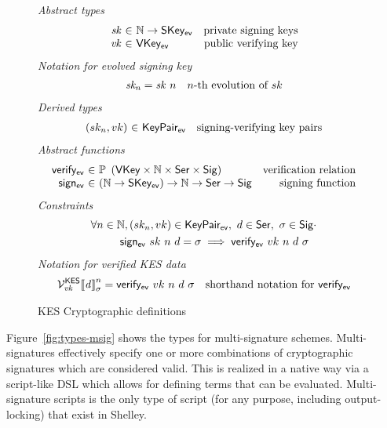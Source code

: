 \begin{figure}[htb]
  \emph{Abstract types}
  \begin{equation*}
    \begin{array}{r@{~\in~}lr}
      \var{sk} & \N \to \SKeyEv & \text{private signing keys}\\
      \var{vk} & \VKeyEv & \text{public verifying key}\\
    \end{array}
  \end{equation*}
  \emph{Notation for evolved signing key}
  \begin{align*}
    & \mathit{sk_n} = \mathit{sk}~n & n\text{-th evolution of }sk
  \end{align*}
  \emph{Derived types}
  \begin{equation*}
    \begin{array}{r@{~\in~}lr}
      (sk_n, vk) & \KeyPairEv & \text{signing-verifying key pairs}
    \end{array}
  \end{equation*}
  \emph{Abstract functions}
  \begin{equation*}
    \begin{array}{r@{~\in~}lr}
      \fun{verify_{ev}} & \powerset{\left(\VKey \times \N \times \Ser \times \Sig\right)}
                        & \text{verification relation}\\
      \fun{sign_{ev}} & (\N \to \SKeyEv) \to \N \to \Ser \to \Sig
                      & \text{signing function}\\
    \end{array}
  \end{equation*}
  \emph{Constraints}
  \begin{align*}
    & \forall n\in\mathbb{N}, (sk_n, vk) \in \mathsf{KeyPair_{ev}}, ~ d \in \mathsf{Ser},~ \sigma \in \mathsf{Sig} \cdot \\
    & ~~~~~~~~\mathsf{sign_{ev}}~{sk}~{n}~{d} = \sigma \implies \mathsf{verify_{ev}} ~ vk ~ n ~ d ~ \sigma
  \end{align*}
  \emph{Notation for verified KES data}
  \begin{align*}
    & \mathcal{V}^{\mathsf{KES}}_{\mathit{vk}}{\llbracket \mathit{d} \rrbracket}_{\sigma}^n
        = \mathsf{verify_{ev}} ~ vk ~ n ~ d ~ \sigma
    & \text{shorthand notation for } \mathsf{verify_{ev}}
  \end{align*}
  \caption{KES Cryptographic definitions}
  \label{fig:kes-defs-shelley}
\end{figure}

Figure~\ref{fig:types-msig} shows the types for multi-signature
schemes. Multi-signatures effectively specify one or more combinations of
cryptographic signatures which are considered valid. This is realized in a
native way via a script-like DSL which allows for defining terms that can be
evaluated. Multi-signature scripts is the only type of script (for any
purpose, including output-locking) that exist in Shelley.

